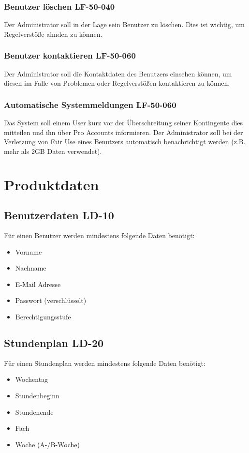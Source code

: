 \documentclass[12pt,a4paper,oneside,ngerman]{scrartcl}
\begin{document}
\subsubsection{Benutzer löschen \hfill LF-50-040}
Der Administrator soll in der Lage sein Benutzer zu löschen. Dies ist wichtig, um Regelverstöße ahnden zu können.

\subsubsection{Benutzer kontaktieren \hfill LF-50-060}
Der Administrator soll die Kontaktdaten des Benutzers einsehen können, um diesen im Falle von Problemen oder Regelverstößen kontaktieren zu können.

\subsubsection{Automatische Systemmeldungen \hfill LF-50-060}
Das System soll einem User kurz vor der Überschreitung seiner Kontingente dies mitteilen und ihn über Pro Accounts informieren. Der Administrator soll bei der Verletzung von Fair Use eines Benutzers automatisch benachrichtigt werden (z.B. mehr als 2GB Daten verwendet).


\section{Produktdaten}
\subsection[Benutzerdaten]{Benutzerdaten \hfill LD-10}
Für einen Benutzer werden mindestens folgende Daten benötigt:
\begin{itemize}
\item Vorname
\item Nachname
\item E-Mail Adresse
\item Passwort (verschlüsselt)
\item Berechtigungsstufe
\end{itemize}

\subsection[Stundenplan]{Stundenplan \hfill LD-20}
Für einen Stundenplan werden mindestens folgende Daten benötigt:
\begin{itemize}
\item Wochentag
\item Stundenbeginn
\item Stundenende
\item Fach
\item Woche (A-/B-Woche)
\end{itemize}
\end{document}

